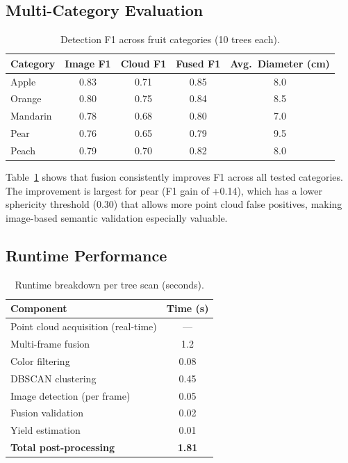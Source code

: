 \documentclass[article,final]{iclr2024_conference}
\begin{document}
\subsection{Multi-Category Evaluation}

\begin{table}[t]
\centering
\caption{Detection F1 across fruit categories (10 trees each).}
\label{tab:multicategory}
\small
\begin{tabular}{lcccc}
\toprule
Category & Image F1 & Cloud F1 & Fused F1 & Avg.\ Diameter (cm) \\
\midrule
Apple & 0.83 & 0.71 & 0.85 & 8.0 \\
Orange & 0.80 & 0.75 & 0.84 & 8.5 \\
Mandarin & 0.78 & 0.68 & 0.80 & 7.0 \\
Pear & 0.76 & 0.65 & 0.79 & 9.5 \\
Peach & 0.79 & 0.70 & 0.82 & 8.0 \\
\bottomrule
\end{tabular}
\end{table}

Table~\ref{tab:multicategory} shows that fusion consistently improves F1 across all tested categories. The improvement is largest for pear (F1 gain of +0.14), which has a lower sphericity threshold (0.30) that allows more point cloud false positives, making image-based semantic validation especially valuable.

\subsection{Runtime Performance}

\begin{table}[t]
\centering
\caption{Runtime breakdown per tree scan (seconds).}
\label{tab:runtime}
\begin{tabular}{lc}
\toprule
Component & Time (s) \\
\midrule
Point cloud acquisition (real-time) & --- \\
Multi-frame fusion & 1.2 \\
Color filtering & 0.08 \\
DBSCAN clustering & 0.45 \\
Image detection (per frame) & 0.05 \\
Fusion validation & 0.02 \\
Yield estimation & 0.01 \\
\midrule
\textbf{Total post-processing} & \textbf{1.81} \\
\bottomrule
\end{tabular}
\end{table}
\end{document}
